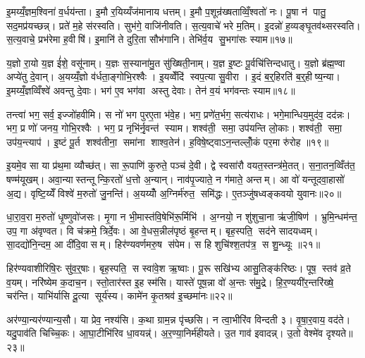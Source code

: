 इ॒मय्यँ॒ज्ञम॒श्विना॑ व॒र्धय॑न्ता। इ॒मौ र॒यिय्यँज॑मानाय धत्तम्। इ॒मौ प॒शून्र॑ख्षताव्विँ॒श्वतो॑ नः। पू॒षा न॑ पातु॒ सद॒मप्र॑यच्छन्न्। प्रते॑ म॒हे स॑रस्वति। सुभ॑गे॒ वाजि॑नीवति। स॒त्य॒वाचे॑ भरे म॒तिम्। इ॒दन्नो॑ ह॒व्यङ्घृ॒तव॑थ्सरस्वति। स॒त्य॒वाचे॒ प्रभ॑रेमा ह॒वीषि॑। इ॒मानि॑ ते दुरि॒ता सौभ॑गानि। तेभि॑र्व॒य सु॒भगा॑सः स्याम॥१७॥\anuvakamend[व॒ज्र्यही॑नामृजी॒षं व्यृ॑ण्वति रख्षतु नो र॒यि सौभ॑गा॒न्येक॑ञ्च]

य॒ज्ञो रा॒यो य॒ज्ञ ई॑शे॒ वसू॑नाम्। य॒ज्ञः स॒स्याना॑मु॒त सु॑ख्षिती॒नाम्। य॒ज्ञ इ॒ष्टः पू॒र्वचि॑त्तिन्दधातु। य॒ज्ञो ब्र॑ह्म॒ण्वा अप्ये॑तु दे॒वान्। अ॒यय्यँ॒ज्ञो व॑र्धता॒ङ्गोभि॒रश्वैः। इ॒यव्वेँदि॑ स्वप॒त्या सु॒वीरा। इ॒दं ब॒र्॒हिरति॑ ब॒र्॒हीष्य॒न्या। इ॒मय्यँ॒ज्ञव्विँश्वे॑ अवन्तु दे॒वाः। भग॑ ए॒व भग॑वा अस्तु देवाः। तेन॑ व॒यं भग॑वन्तः स्याम॥१८॥

तन्त्वा॑ भग॒ सर्व॒ इज्जो॑हवीमि। स नो॑ भग पुरए॒ता भ॑वे॒ह। भग॒ प्रणे॑त॒र्भग॒ सत्य॑राधः। भगे॒मान्धिय॒मुद॑व॒ दद॑न्नः। भग॒ प्र णो॑ जनय॒ गोभि॒रश्वैः। भग॒ प्र नृभि॑र्नृ॒वन्त॑ स्याम। शश्व॑ती॒ समा॒ उप॑यन्ति लो॒काः। शश्व॑ती॒ समा॒ उप॑य॒न्त्याप॑। इ॒ष्टं पू॒र्त शश्व॑तीना॒ समा॑ना शाश्व॒तेन॑। ह॒विषे॒ष्ट्वाऽन॒न्तल्लोँ॒कं पर॒मा रु॑रोह ॥१९॥

इ॒यमे॒व सा या प्र॑थ॒मा व्यौच्छ॑त्। सा रू॒पाणि॑ कुरुते॒ पञ्च॑ दे॒वी। द्वे स्वसा॑रौ वयत॒स्तन्त्र॑मे॒तत्। स॒ना॒तन॒व्विँत॑त॒ षण्म॑यूखम्। अवा॒न्यास्तन्तून्कि॒रतो॑ ध॒त्तो अ॒न्यान्। नाव॑पृ॒ज्याते॒ न ग॑माते॒ अन्तम्। आ वो॑ यन्तूदवा॒हासो॑ अ॒द्य। वृष्टि॒य्येँ विश्वे॑ म॒रुतो॑ जु॒नन्ति॑। अ॒यय्योँ अ॒ग्निर्म॑रुत॒ समि॑द्धः। ए॒तञ्जु॑षध्वङ्कवयो युवानः॥२०॥

धा॒रा॒व॒रा म॒रुतो॑ धृ॒ष्णुवो॑जसः। मृ॒गा न भी॒मास्त॑वि॒षेभि॑रू॒र्मिभि॑। अ॒ग्नयो॒ न शु॑शुचा॒ना ऋ॑जी॒षिण॑। भ्रुमि॒न्धम॑न्त॒ उप॒ गा अ॑वृण्वत। वि च॑क्रमे॒ त्रिर्दे॒वः। आ वे॒धस॒न्नील॑पृष्ठं बृ॒हन्तम्। बृह॒स्पति॒ सद॑ने सादयध्वम्। सा॒दद्यो॑नि॒न्दम॒ आ दी॑दि॒वासम्। हिर॑ण्यवर्णमरु॒ष स॑पेम। स हि शुचि॑श्श॒तप॑त्र॒ स शु॒न्ध्यूः ॥२१॥

हिर॑ण्यवाशीरिषि॒रः सु॑व॒र्॒षाः। बृह॒स्पति॒ स स्वा॑वे॒श ऋ॒ष्वाः। पू॒रू सखि॑भ्य आसु॒तिङ्क॑रिष्ठः। पूष॒ स्तव॑ व्र॒ते व॒यम्। नरि॑ष्येम क॒दाच॒न। स्तो॒तार॑स्त इ॒ह स्म॑सि। यास्ते॑ पूष॒न्ना वो॑ अ॒न्तः स॑मु॒द्रे। हि॒र॒ण्ययी॑र॒न्तरि॑ख्षे॒ चर॑न्ति। याभि॑र्यासि दू॒त्या सूर्य॑स्य। कामे॑न कृ॒तश्रव॑ इ॒च्छमा॑नः॥२२॥

अर॑ण्या॒न्यर॑ण्यान्य॒सौ। या प्रेव॒ नश्य॑सि। क॒था ग्राम॒न्न पृ॑च्छसि। न त्वा॒भीरि॑व विन्दती ३। वृ॒षा॒र॒वाय॒ वद॑ते। यदु॒पाव॑ति चिच्चि॒कः। आ॒घा॒टीभि॑रिव धा॒वयन्न्॑। अ॒र॒ण्या॒निर्म॑हीयते। उ॒त गाव॑ इवादन्न्। उ॒तो वेश्मे॑व दृश्यते॥२३॥

